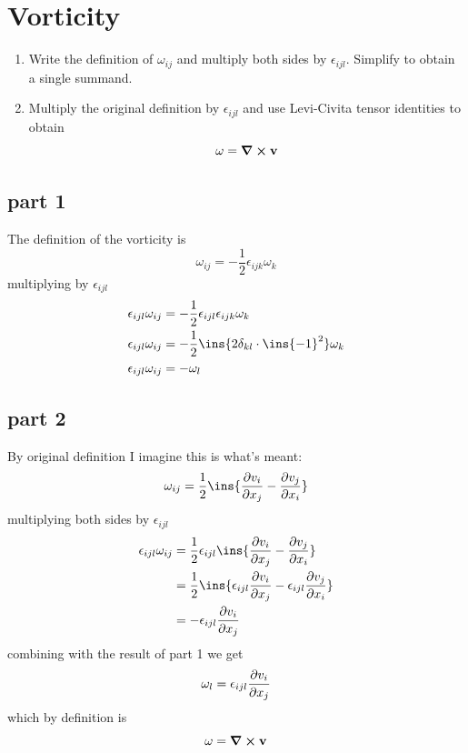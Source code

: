 \clearpage
\section{Vorticity}
\begin{colbox}
	\begin{enumerate}
		\item Write the definition of \(\omega_{ij}\) and multiply both sides by \(\epsilon_{ijl}\). Simplify to obtain a single summand.
		\item Multiply the original definition by \(\epsilon_{ijl}\) and use Levi-Civita tensor identities to obtain \begin{equation}
			\vb{\omega} = \curl{\vb{v}}
		\end{equation}
	\end{enumerate}
\end{colbox}
\subsection{part 1}
The definition of the vorticity is 
\begin{equation}
	\omega_{ij} = -\frac{1}{2}\epsilon_{ijk}\omega_k
\end{equation}
multiplying by \(\epsilon_{ijl}\)
\begin{align}
	\epsilon_{ijl}\omega_{ij} &= -\frac{1}{2}\epsilon_{ijl}\epsilon_{ijk}\omega_k\\
	\epsilon_{ijl}\omega_{ij} &= -\frac{1}{2}\ins{2\delta_{kl}\cdot\ins{-1}^{2}}\omega_k\\
	\epsilon_{ijl}\omega_{ij} &= -\omega_l
\end{align}
\subsection{part 2}
By original definition I imagine this is what's meant:
\begin{equation}
	\omega_{ij} = \frac{1}{2}\ins{\pdv{v_i}{x_j}-\pdv{v_j}{x_i}}
\end{equation}
multiplying both sides by \(\epsilon_{ijl}\)
\begin{align}
	\epsilon_{ijl}\omega_{ij} &= \frac{1}{2}\epsilon_{ijl}\ins{\pdv{v_i}{x_j}-\pdv{v_j}{x_i}} \\
	&= \frac{1}{2}\ins{\epsilon_{ijl}\pdv{v_i}{x_j}-\epsilon_{ijl}\pdv{v_j}{x_i}}\\
	&= -\epsilon_{ijl}\pdv{v_i}{x_j}
\end{align}
combining with the result of part 1 we get
\begin{equation}
	\omega_l = \epsilon_{ijl}\pdv{v_i}{x_j}
\end{equation}
which by definition is 
\begin{equation}
	\vb{\omega} = \curl{\vb{v}}
\end{equation}